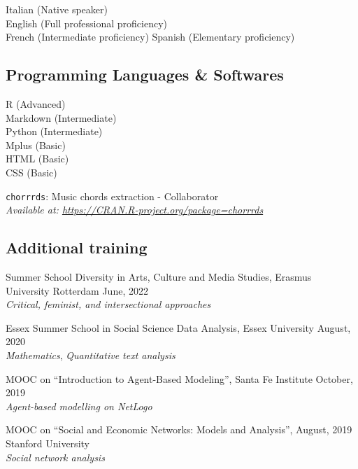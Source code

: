 \documentclass[12pt,]{article}
\begin{document}
Italian (Native speaker)\\
English (Full professional proficiency)\\
French (Intermediate proficiency) Spanish (Elementary proficiency)\\
\newline

\hypertarget{programming-languages-softwares}{%
\subsection{Programming Languages \&
Softwares}\label{programming-languages-softwares}}

R (Advanced)\\
Markdown (Intermediate)\\
Python (Intermediate)\\
Mplus (Basic)\\
HTML (Basic)\\
CSS (Basic) \newline

\texttt{chorrrds}: Music chords extraction - Collaborator\\
\emph{Available at: \url{https://CRAN.R-project.org/package=chorrrds}}

\hypertarget{additional-training}{%
\subsection{Additional training}\label{additional-training}}

Summer School Diversity in Arts, Culture and Media Studies, Erasmus
University Rotterdam \hfill \begingroup\small June, 2022\endgroup\\
\emph{Critical, feminist, and intersectional approaches}

Essex Summer School in Social Science Data Analysis, Essex University
\hfill \begingroup\small August, 2020\endgroup\\
\emph{Mathematics}, \emph{Quantitative text analysis}

MOOC on ``Introduction to Agent-Based Modeling'', Santa Fe Institute
\hfill \begingroup\small October, 2019\endgroup\\
\emph{Agent-based modelling on NetLogo}

MOOC on ``Social and Economic Networks: Models and Analysis'',
\hfill \begingroup\small August, 2019\endgroup\\
Stanford University\\
\emph{Social network analysis}
\end{document}
